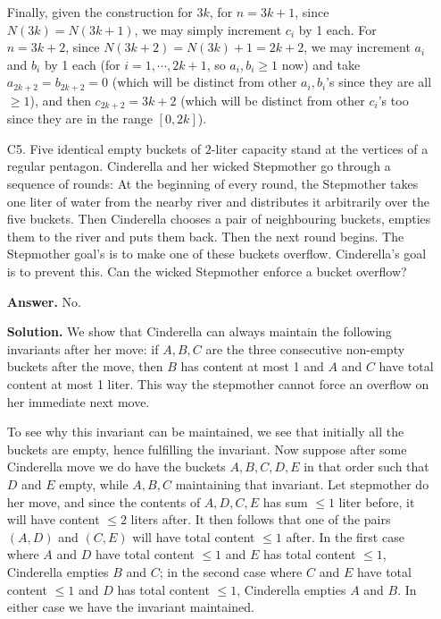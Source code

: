 \documentclass[11pt,a4paper]{article}
\begin{document}
\begin{enumerate}
        Finally, given the construction for $3k$, 
        for $n=3k+1$, since $N(3k)=N(3k+1)$, we may simply increment $c_i$ by 1 each. 
        For $n=3k+2$, since $N(3k + 2) = N(3k) + 1 = 2k+2$, 
        we may increment $a_i$ and $b_i$ by 1 each (for $i=1, \cdots, 2k+1$, so $a_i, b_i\ge 1$ now) and take $a_{2k+2}=b_{2k+2}=0$ (which will be distinct from other $a_i, b_i$'s since they are all $\ge 1$), and then $c_{2k+2}=3k+2$ 
        (which will be distinct from other $c_i$'s too since they are in the range $[0, 2k]$). 
    	
    	\item [C5.]
    	Five identical empty buckets of $2$-liter capacity stand at the vertices of a regular pentagon. Cinderella and her wicked Stepmother go through a sequence of rounds: At the beginning of every round, the Stepmother takes one liter of water from the nearby river and distributes it arbitrarily over the five buckets. Then Cinderella chooses a pair of neighbouring buckets, empties them to the river and puts them back. Then the next round begins. The Stepmother goal's is to make one of these buckets overflow. Cinderella's goal is to prevent this. Can the wicked Stepmother enforce a bucket overflow?
    	
    	\textbf{Answer.} No. 
    	
    	\textbf{Solution.} We show that Cinderella can always maintain the following invariants after her move: 
    	if $A, B, C$ are the three consecutive non-empty buckets after the move, then $B$ has content at most 1 and $A$ and $C$ have total content at most 1 liter. 
    	This way the stepmother cannot force an overflow on her immediate next move. 
    	
    	To see why this invariant can be maintained, we see that initially all the buckets are empty, hence fulfilling the invariant. 
    	Now suppose after some Cinderella move we do have the buckets $A, B, C, D, E$ in that order such that $D$ and $E$ empty, while $A, B, C$ maintaining that invariant. 
    	Let stepmother do her move, and since the contents of $A, D, C, E$ has sum $\le 1$ liter before, it will have content $\le 2$ liters after. 
    	It then follows that one of the pairs $(A, D)$ and $(C, E)$ will have total content $\le 1$ after. 
    	In the first case where $A$ and $D$ have total content $\le 1$ and $E$ has total content $\le 1$, Cinderella empties $B$ and $C$; 
    	in the second case where $C$ and $E$ have total content $\le 1$ and $D$ has total content $\le 1$, Cinderella empties $A$ and $B$. 
    	In either case we have the invariant maintained. 
    	

\end{enumerate}
\end{document}

